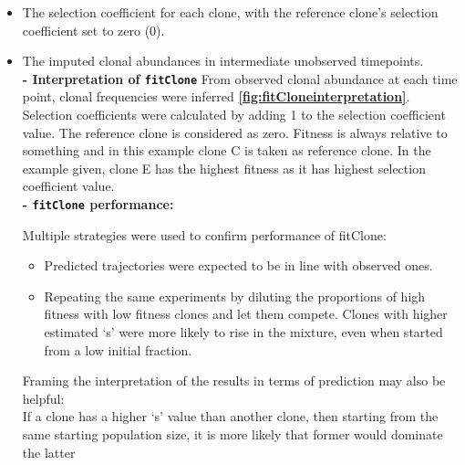 	\begin{itemize}
 	    \item 	The selection coefficient for each clone, with the reference clone's selection coefficient set to zero (0).
		\item	The imputed clonal abundances in intermediate unobserved timepoints.
\\ 
 \textbf{- Interpretation of \texttt{fitClone} } 
 From observed clonal abundance at each time point, clonal frequencies were inferred \textbf{\autoref{fig:fitCloneinterpretation}}. Selection coefficients were calculated by adding 1 to the selection coefficient value. The reference clone is considered as zero. Fitness is always relative to something and in this example clone C is taken as reference clone. In the example given, clone E has the highest fitness as it has highest selection coefficient value.
\\
\textbf{- \texttt{fitClone} \textbf{performance:} } 

Multiple strategies were used to confirm performance of fitClone:
\begin{itemize}
	
	\item Predicted trajectories were expected to be in line with observed ones.
	
	\item Repeating the same experiments by diluting the proportions of high fitness with low fitness clones and let them compete. Clones with higher estimated `s' were more likely to rise in the mixture, even when started from a low initial fraction.

\end{itemize}
Framing the interpretation of the results in terms of prediction may also be helpful:
\\
If a clone has a higher `s' value than another clone, then starting from the same starting population size, it is more likely that former would dominate the latter



 
 
 
 
 
 


\end{itemize}

